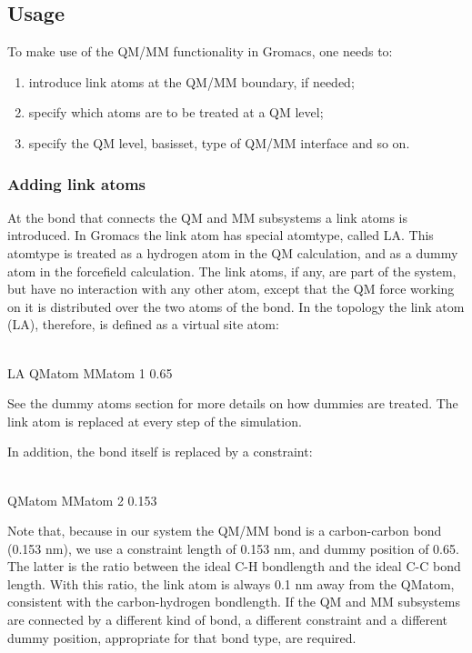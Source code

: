 \subsection{Usage}

To make use of the QM/MM functionality in Gromacs, one needs to:

\begin{enumerate}
\item introduce link atoms at the QM/MM boundary, if needed;
\item specify which atoms are to be treated at a QM level;
\item specify the QM level, basisset, type of QM/MM interface and so on. 
\end{enumerate}

\subsubsection{Adding link atoms}

At the bond that connects the QM and MM subsystems a link atoms is
introduced.  In Gromacs the link atom has special atomtype, called
LA. This atomtype is treated as a hydrogen atom in the QM calculation,
and as a dummy atom in the forcefield calculation. The link atoms, if
any, are part of the system, but have no interaction with any other
atom, except that the QM force working on it is distributed over the
two atoms of the bond. In the topology the link atom (LA), therefore,
is defined as a virtual site atom:\\

\begin{tt}
\\
LA QMatom MMatom 1 0.65\\
\end{tt}

See the dummy atoms section for more details on how dummies are
treated. The link atom is replaced at every step of the simulation.

In addition, the bond itself is replaced by a constraint:

\begin{tt}
[ constraints ] \\
QMatom MMatom 2 0.153\\
\end{tt}

Note that, because in our system the QM/MM bond is a carbon-carbon
bond (0.153 nm), we use a constraint length of 0.153 nm, and dummy
position of 0.65. The latter is the ratio between the ideal C-H
bondlength and the ideal C-C bond length. With this ratio, the link
atom is always 0.1 nm away from the QMatom, consistent with the
carbon-hydrogen bondlength. If the QM and MM subsystems are connected
by a different kind of bond, a different constraint and a different
dummy position, appropriate for that bond type, are required.

